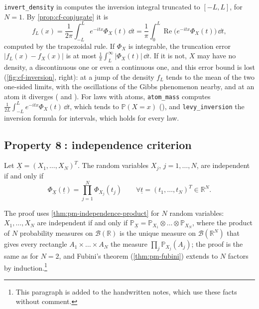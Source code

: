\begin{remark}[computational]\label{rem:cf-code-inversion}
\texttt{invert\_density} in  computes the inversion
integral truncated to $[-L,L]$, for $N=1$. By \cref{prop:cf-conjugate} it is
\[
  f_L(x)=\frac1{2\pi}\int_{-L}^Le^{-itx}\Phi_X(t)\,\dd t=\frac1\pi\int_0^L\operatorname{Re}\big(e^{-itx}\Phi_X(t)\big)\,\dd t,
\]
computed by the trapezoidal rule. If $\Phi_X$ is integrable, the truncation error
$|f_L(x)-f_X(x)|$ is at most $\frac1\pi\int_L^{\infty}|\Phi_X(t)|\,\dd t$. If it is not, $X$ may
have no density, a discontinuous one or even a continuous one, and this error bound is lost
(\cref{fig:cf-inversion}, right): at a jump of the density $f_L$ tends to the mean of the two
one-sided limits, with the oscillations of the Gibbs phenomenon nearby, and at an atom it
diverges ( and ). For laws with
atoms, \texttt{atom\_mass} computes $\frac1{2L}\int_{-L}^Le^{-itx}\Phi_X(t)\,\dd t$, which tends
to $\mathbb P(X=x)$ (), and \texttt{levy\_inversion} the inversion
formula for intervals, which holds for every law.
\end{remark}


\subsection{Property \textcircled{\scriptsize 8}: independence criterion}\label{sec:cf-independence-criterion}

\begin{theorem}\label{thm:cf-independence-criterion}
Let $\underline X=(X_1,\dots,X_N)^T$. The random variables $X_j$, $j=1,\dots,N$, are
independent if and only if
\[
  \Phi_{\underline X}(\underline t)=\prod_{j=1}^N\Phi_{X_j}(t_j)\qquad\forall\underline t=(t_1,\dots,t_N)^T\in\mathbb R^N .
\]
\end{theorem}

The proof uses \cref{thm:pm-independence-product} for $N$ random variables: $X_1,\dots,X_N$
are independent if and only if
$\mathbb P_{\underline X}=\mathbb P_{X_1}\otimes\dots\otimes\mathbb P_{X_N}$, where the product of
$N$ probability measures on $\mathcal B(\mathbb R)$ is the unique measure on
$\mathcal B(\mathbb R^N)$ that gives every rectangle $A_1\times\dots\times A_N$ the measure
$\prod_j\mathbb P_{X_j}(A_j)$; the proof is the same as for $N=2$, and Fubini's theorem
(\cref{thm:pm-fubini}) extends to $N$ factors by induction.\footnote{This paragraph is added to
the handwritten notes, which use these facts without comment.}

